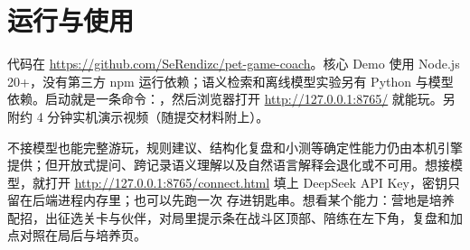 \section{运行与使用}

代码在 \url{https://github.com/SeRendizc/pet-game-coach}。核心 Demo 使用 Node.js 20+，没有第三方 npm 运行依赖；语义检索和离线模型实验另有 Python 与模型依赖。启动就是一条命令：，然后浏览器打开 \url{http://127.0.0.1:8765/} 就能玩。另附约 4 分钟实机演示视频（随提交材料附上）。

不接模型也能完整游玩，规则建议、结构化复盘和小测等确定性能力仍由本机引擎提供；但开放式提问、跨记录语义理解以及自然语言解释会退化或不可用。想接模型，就打开 \url{http://127.0.0.1:8765/connect.html} 填上 DeepSeek API Key，密钥只留在后端进程内存里；也可以先跑一次  存进钥匙串。想看某个能力：营地是培养配招，出征选关卡与伙伴，对局里提示条在战斗区顶部、陪练在左下角，复盘和加点对照在局后与培养页。
